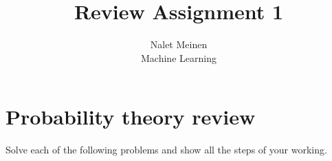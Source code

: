\documentclass[12pt]{article}
\begin{document}


\title{Review Assignment 1}%
\author{Nalet Meinen \\ %
Machine Learning
}

\maketitle

\section{Probability theory review}

Solve each of the following problems and show all the steps of your working.
\end{document}
